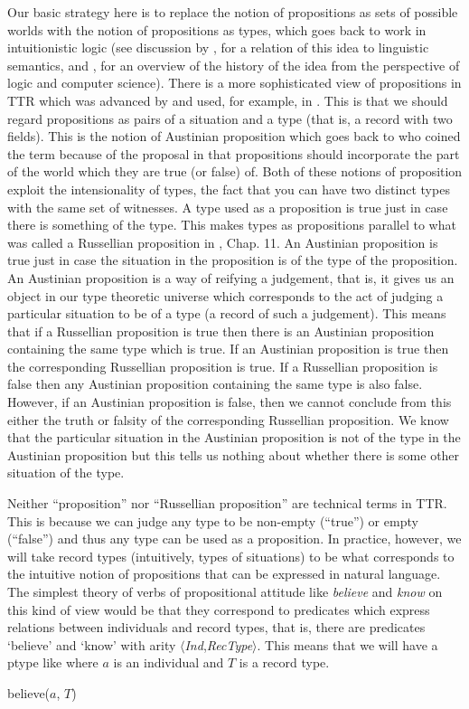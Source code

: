Our basic strategy here is to replace the notion of propositions as
sets of possible worlds with the notion of propositions as types,
which goes back to work in intuitionistic logic (see discussion by
\citealp{Ranta1994}, for a relation of this idea to linguistic
semantics, and \citealp{Wadler2015}, for an overview of the history of
the idea from the perspective of logic and computer science).
There is a more sophisticated view of propositions in TTR which was
advanced by \cite{Ginzburg2012} and used, for example, in
\cite{CooperDobnikLappinLarsson2015}.  This is that we should
regard propositions as pairs of a situation and a type (that is, a
record with two fields).  This is the notion of Austinian proposition
which goes back to \cite{BarwisePerry1983} who coined the term because
of the proposal in \cite{Austin1961} that propositions should
incorporate the part of the world which they are true (or false) of.
Both of these notions of proposition exploit the intensionality of
types, the fact that you can have two distinct types with the same set
of witnesses.  A type used as a proposition is true just in case there
is something of the type.  This makes types as propositions parallel
to what was called a Russellian proposition in
\cite{Barwise1989}, Chap. 11.  An Austinian proposition is true just in
case the situation in the proposition is of the type of the
proposition.  An Austinian proposition is a way of reifying a
judgement, that is, it gives us an object in our type theoretic
universe which corresponds to the act of judging a particular
situation to be of a type (a record of such a judgement). This means
that if a Russellian proposition is true then there is an Austinian
proposition containing the same type which is true.  If an Austinian
proposition is true then the corresponding Russellian proposition is
true.  If a Russellian proposition is false then any Austinian
proposition containing the same type is also false.  However, if an
Austinian proposition is false, then we cannot conclude from this
either the truth or falsity of the corresponding Russellian
proposition.  We know that the particular situation in the Austinian
proposition is not of the type in the Austinian proposition but this
tells us nothing about whether there is some other situation of the
type.

Neither ``proposition'' nor ``Russellian proposition'' are technical
terms in TTR. This is because we can judge any type to be non-empty
(``true'') or empty (``false'') and thus any type can be used as a
proposition.  In practice, however, we will take record types
(intuitively, types of situations) to be what corresponds to the
intuitive notion of propositions that can be expressed in natural
language.  The simplest theory of verbs of propositional attitude like
\textit{believe} and \textit{know} on this kind of view would be that
they correspond to predicates which express relations between
individuals and record types, that is, there are predicates `believe'
and `know' with arity
$\langle$\textit{Ind},\textit{RecType}$\rangle$.  This means that we
will have a ptype like \nexteg{} where $a$ is an individual and $T$ is
a record type.
\begin{ex} 
believe($a$, $T$) 
\end{ex}

